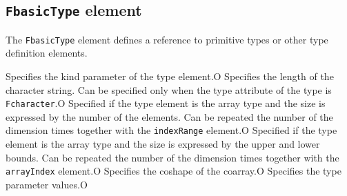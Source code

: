 \subsection{ {\tt FbasicType} element}

The {\tt FbasicType} element defines a reference to primitive types or other type definition elements.


\begin{XcodeMLChildElements}
{Specifies the kind parameter of the type element.}{O}
{Specifies the length of the character string. Can be specified only when the type attribute of the type is {\tt Fcharacter}.}{O}
{Specified if the type element is the array type and the size is expressed by the number of the elements. Can be repeated the number of the dimension times together with the {\tt indexRange} element.}{O}
{Specified if the type element is the array type and the size is expressed by the upper and lower bounds. Can be repeated the number of the dimension times together with the {\tt arrayIndex} element.}{O}
{Specifies the coshape of the coarray.}{O}
{Specifies the type parameter values.}{O}
\end{XcodeMLChildElements}

